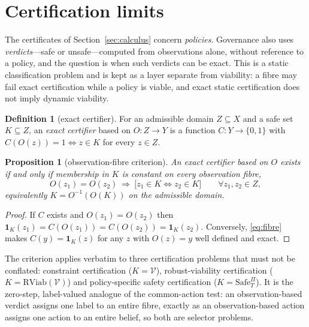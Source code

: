 \documentclass[11pt,a4paper]{article}
\theoremstyle{plain}
\newtheorem{proposition}[theorem]{Proposition}
\theoremstyle{definition}
\newtheorem{definition}[theorem]{Definition}
\theoremstyle{remark}
\newcommand{\RViab}{\mathrm{RViab}}
\newcommand{\cV}{\mathcal{V}}
\begin{document}
\section{Certification limits}\label{sec:certification}

The certificates of Section~\ref{sec:calculus} concern \emph{policies}. Governance also uses \emph{verdicts}---safe or unsafe---computed from observations alone, without reference to a policy, and the question is when such verdicts can be exact. This is a static classification problem and is kept as a layer separate from viability: a fibre may fail exact certification while a policy is viable, and exact static certification does not imply dynamic viability.

\begin{definition}[exact certifier]\label{def:certifier}
For an admissible domain $Z\subseteq X$ and a safe set $K\subseteq Z$, an \emph{exact certifier} based on $O:Z\to Y$ is a function $C:Y\to\{0,1\}$ with $C(O(z))=1\iff z\in K$ for every $z\in Z$.
\end{definition}

\begin{proposition}[observation-fibre criterion]\label{prop:fibre}
An exact certifier based on $O$ exists if and only if membership in $K$ is constant on every observation fibre,
\begin{equation}\label{eq:fibre}
O(z_1)=O(z_2)\ \Longrightarrow\ \bigl[z_1\in K\iff z_2\in K\bigr]\qquad\forall z_1,z_2\in Z,
\end{equation}
equivalently $K=O^{-1}(O(K))$ on the admissible domain.
\end{proposition}

\begin{proof}
If $C$ exists and $O(z_1)=O(z_2)$ then $\mathbf 1_K(z_1)=C(O(z_1))=C(O(z_2))=\mathbf 1_K(z_2)$. Conversely, \eqref{eq:fibre} makes $C(y)=\mathbf 1_K(z)$ for any $z$ with $O(z)=y$ well defined and exact.
\end{proof}

The criterion applies verbatim to three certification problems that must not be conflated: constraint certification ($K=\cV$), robust-viability certification ($K=\RViab(\cV)$) and policy-specific safety certification ($K=\mathrm{Safe}^\Pi_T$). It is the zero-step, label-valued analogue of the common-action test: an observation-based verdict assigns one label to an entire fibre, exactly as an observation-based action assigns one action to an entire belief, so both are selector problems.
\end{document}
